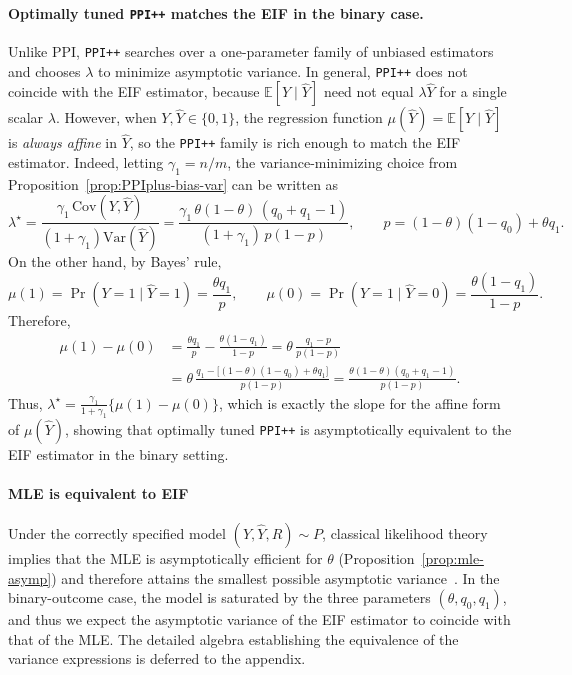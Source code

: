 \documentclass[11pt]{article}
\newcommand{\E}{\mathbb{E}}
\newcommand{\Var}{\mathrm{Var}}
\newcommand{\Cov}{\mathrm{Cov}}
\newcommand{\1}{\mathbf{1}}
\theoremstyle{remark}
\begin{document}
\paragraph{\textbf{Optimally tuned \texttt{PPI++} matches the EIF in the binary case.}}
Unlike PPI, \texttt{PPI++} searches over a one-parameter family of unbiased estimators and chooses
$\lambda$ to minimize asymptotic variance. In general, \texttt{PPI++} does not coincide with the EIF estimator,
because $\E[Y\mid \hat Y]$ need not equal $\lambda \hat Y$ for a single scalar $\lambda$. However, when
$Y,\hat Y\in\{0,1\}$, the regression function $\mu(\hat Y)=\E[Y\mid \hat Y]$ is \emph{always affine} in
$\hat Y$, so the \texttt{PPI++} family is rich enough to match the EIF estimator. Indeed, letting $\gamma_1=n/m$, the
variance-minimizing choice from Proposition~\ref{prop:PPIplus-bias-var} can be written as
\[
\lambda^\star
=
\frac{\gamma_1\,\Cov(Y,\hat Y)}{(1+\gamma_1)\Var(\hat Y)}
=
\frac{\gamma_1\,\theta(1-\theta)\,(q_0+q_1-1)}{(1+\gamma_1)\,p(1-p)},
\qquad
p=(1-\theta)(1-q_0)+\theta q_1.
\]
On the other hand, by Bayes' rule,
\begin{equation}
\mu(1)=\Pr(Y=1\mid \hat Y=1)=\frac{\theta q_1}{p},
\qquad
\mu(0)=\Pr(Y=1\mid \hat Y=0)=\frac{\theta(1-q_1)}{1-p}.
\end{equation}
Therefore,
\begin{align*}
\mu(1)-\mu(0)
&=
\frac{\theta q_1}{p}-\frac{\theta(1-q_1)}{1-p}
=\theta\,\frac{q_1-p}{p(1-p)}\\
&=
\theta\,\frac{q_1-\bigl[(1-\theta)(1-q_0)+\theta q_1\bigr]}{p(1-p)}
=
\frac{\theta(1-\theta)(q_0+q_1-1)}{p(1-p)}.
\end{align*}
Thus, $\lambda^\star=\frac{\gamma_1}{1+\gamma_1}\bigl\{\mu(1)-\mu(0)\bigr\}$, which is exactly the slope for the affine form of $\mu(\hat Y)$, showing that optimally tuned \texttt{PPI++} is
asymptotically equivalent to the EIF estimator in the binary setting.

\paragraph{\textbf{MLE is equivalent to EIF}}
Under the correctly specified model $(Y, \widehat Y, R) \sim P$, classical likelihood
theory implies that the MLE is asymptotically efficient for $\theta$
(Proposition~\ref{prop:mle-asymp}) and therefore attains the smallest possible
asymptotic variance~\citep{bickel1993efficient}. In the binary-outcome case, the
model is saturated by the three parameters $(\theta, q_0, q_1)$, and thus we
expect the asymptotic variance of the EIF estimator to coincide with that of the
MLE. The detailed algebra establishing the equivalence of the variance expressions
is deferred to the appendix.
\end{document}
